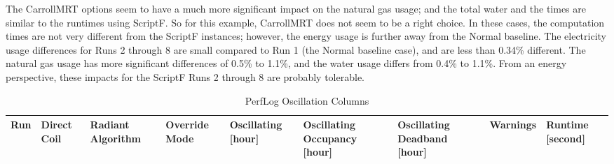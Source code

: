 The CarrollMRT options seem to have a much more significant impact on the natural gas usage; and the total water and the times are similar to the runtimes using ScriptF. So for this example, CarrollMRT does not seem to be a right choice. In these cases, the computation times are not very different from the ScriptF instances; however, the energy usage is further away from the Normal baseline. The electricity usage differences for Runs 2 through 8 are small compared to Run 1 (the Normal baseline case), and are less than 0.34\% different. The natural gas usage has more significant differences of 0.5\% to 1.1\%, and the water usage differs from 0.4\% to 1.1\%. From an energy perspective, these impacts for the ScriptF Runs 2 through 8 are probably tolerable.

        {\scriptsize
\begin{longtable}[c]{p{0.2in}p{0.4in}p{0.55in}p{0.7in}p{0.5in}p{0.6in}p{0.7in}p{0.6in}p{0.6in}}
    \caption{PerfLog Oscillation Columns\label{table:perflog_oscillation_columns}} \tabularnewline
    \toprule
    Run &
    Direct Coil &
    Radiant Algorithm &
    Override Mode &
    Oscillating {[}hour{]} &
    Oscillating Occupancy {[}hour{]} &
    Oscillating Deadband {[}hour{]} &
    Warnings &
    Runtime {[}second{]} \tabularnewline
    \midrule
    \endfirsthead


\end{longtable}}

